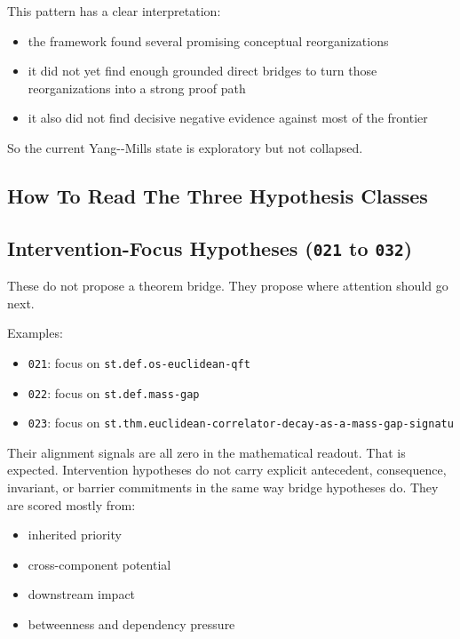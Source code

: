 \documentclass[
]{article}
\providecommand{\tightlist}{%
  \setlength{\itemsep}{0pt}\setlength{\parskip}{0pt}}
\begin{document}
This pattern has a clear interpretation:

\begin{itemize}
\tightlist
\item
  the framework found several promising conceptual reorganizations
\item
  it did not yet find enough grounded direct bridges to turn those
  reorganizations into a strong proof path
\item
  it also did not find decisive negative evidence against most of the
  frontier
\end{itemize}

So the current Yang-\/-Mills state is exploratory but not collapsed.

\subsection{How To Read The Three Hypothesis
Classes}\label{how-to-read-the-three-hypothesis-classes}

\subsection{\texorpdfstring{Intervention-Focus Hypotheses (\texttt{021}
to
\texttt{032})}{Intervention-Focus Hypotheses (021 to 032)}}\label{intervention-focus-hypotheses-021-to-032}

These do not propose a theorem bridge. They propose where attention
should go next.

Examples:

\begin{itemize}
\tightlist
\item
  \texttt{021}: focus on \texttt{st.def.os-euclidean-qft}
\item
  \texttt{022}: focus on \texttt{st.def.mass-gap}
\item
  \texttt{023}: focus on
  \texttt{st.thm.euclidean-correlator-decay-as-a-mass-gap-signatu}
\end{itemize}

Their alignment signals are all zero in the mathematical readout. That
is expected. Intervention hypotheses do not carry explicit antecedent,
consequence, invariant, or barrier commitments in the same way bridge
hypotheses do. They are scored mostly from:

\begin{itemize}
\tightlist
\item
  inherited priority
\item
  cross-component potential
\item
  downstream impact
\item
  betweenness and dependency pressure
\end{itemize}
\end{document}
